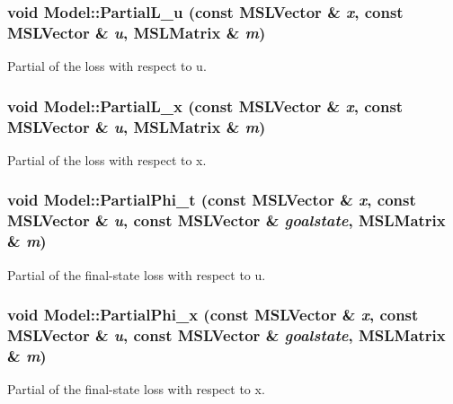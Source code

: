 \subsubsection{\setlength{\rightskip}{0pt plus 5cm}void Model::Partial\-L\_\-u (const {\bf MSLVector} \& {\em x}, const {\bf MSLVector} \& {\em u}, {\bf MSLMatrix} \& {\em m})\hspace{0.3cm}{\tt  [inline, virtual]}}\label{class_Model_a14}


Partial of the loss with respect to u.

\subsubsection{\setlength{\rightskip}{0pt plus 5cm}void Model::Partial\-L\_\-x (const {\bf MSLVector} \& {\em x}, const {\bf MSLVector} \& {\em u}, {\bf MSLMatrix} \& {\em m})\hspace{0.3cm}{\tt  [inline, virtual]}}\label{class_Model_a13}


Partial of the loss with respect to x.

\subsubsection{\setlength{\rightskip}{0pt plus 5cm}void Model::Partial\-Phi\_\-t (const {\bf MSLVector} \& {\em x}, const {\bf MSLVector} \& {\em u}, const {\bf MSLVector} \& {\em goalstate}, {\bf MSLMatrix} \& {\em m})\hspace{0.3cm}{\tt  [inline, virtual]}}\label{class_Model_a17}


Partial of the final-state loss with respect to u.

\subsubsection{\setlength{\rightskip}{0pt plus 5cm}void Model::Partial\-Phi\_\-x (const {\bf MSLVector} \& {\em x}, const {\bf MSLVector} \& {\em u}, const {\bf MSLVector} \& {\em goalstate}, {\bf MSLMatrix} \& {\em m})\hspace{0.3cm}{\tt  [inline, virtual]}}\label{class_Model_a16}


Partial of the final-state loss with respect to x.

